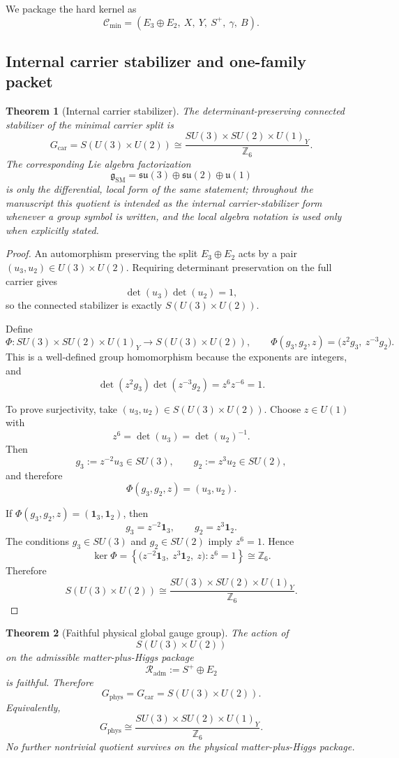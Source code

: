 \documentclass[11pt,a4paper]{article}
\newtheorem{theorem}{Theorem}[section]
\theoremstyle{definition}
\theoremstyle{remark}
\newcommand{\SM}{\mathrm{SM}}
\newcommand{\Cmin}{\mathcal C_{\min}}
\begin{document}
We package the hard kernel as
\[
\Cmin=(E_3\oplus E_2,\ X,\ Y,\ S^+,\ \gamma,\ B).
\]

\subsection{Internal carrier stabilizer and one-family packet}

\begin{theorem}[Internal carrier stabilizer]
\label{thm:global-sm-theorem}
The determinant-preserving connected stabilizer of the minimal carrier split is
\[
G_{\mathrm{car}}
=
S(U(3)\times U(2))
\cong
\frac{SU(3)\times SU(2)\times U(1)_Y}{\mathbb Z_6}.
\]
The corresponding Lie algebra factorization
\[
\mathfrak g_{\SM}=\mathfrak{su}(3)\oplus\mathfrak{su}(2)\oplus\mathfrak u(1)
\]
is only the differential, local form of the same statement; throughout the manuscript this quotient
is intended as the internal carrier-stabilizer form whenever a group symbol is written, and the
local algebra notation is used only when explicitly stated.
\end{theorem}

\begin{proof}
An automorphism preserving the split $E_3\oplus E_2$ acts by a pair
$(u_3,u_2)\in U(3)\times U(2)$. Requiring determinant preservation on the full
carrier gives
\[
\det(u_3)\det(u_2)=1,
\]
so the connected stabilizer is exactly $S(U(3)\times U(2))$.

Define
\[
\Phi:SU(3)\times SU(2)\times U(1)_Y \longrightarrow S(U(3)\times U(2)),
\qquad
\Phi(g_3,g_2,z)=\bigl(z^2 g_3,\ z^{-3} g_2\bigr).
\]
This is a well-defined group homomorphism because the exponents are integers, and
\[
\det(z^2 g_3)\det(z^{-3} g_2)=z^6 z^{-6}=1.
\]

To prove surjectivity, take $(u_3,u_2)\in S(U(3)\times U(2))$. Choose
$z\in U(1)$ with
\[
z^6=\det(u_3)=\det(u_2)^{-1}.
\]
Then
\[
g_3:=z^{-2}u_3\in SU(3),
\qquad
g_2:=z^{3}u_2\in SU(2),
\]
and therefore
\[
\Phi(g_3,g_2,z)=(u_3,u_2).
\]

If $\Phi(g_3,g_2,z)=(\mathbf 1_3,\mathbf 1_2)$, then
\[
g_3=z^{-2}\mathbf 1_3,
\qquad
g_2=z^{3}\mathbf 1_2.
\]
The conditions $g_3\in SU(3)$ and $g_2\in SU(2)$ imply $z^6=1$. Hence
\[
\ker\Phi
=
\left\{
\bigl(z^{-2}\mathbf 1_3,\ z^{3}\mathbf 1_2,\ z\bigr): z^6=1
\right\}
\cong \mathbb Z_6.
\]
Therefore
\[
S(U(3)\times U(2))
\cong
\frac{SU(3)\times SU(2)\times U(1)_Y}{\mathbb Z_6}.
\]
\end{proof}

\begin{theorem}[Faithful physical global gauge group]
\label{thm:physical-gauge-group}
\label{thm:physical-gauge-group-faithful}
The action of
\[
S(U(3)\times U(2))
\]
on the admissible matter-plus-Higgs package
\[
\mathcal R_{\mathrm{adm}}:=S^+\oplus E_2
\]
is faithful. Therefore
\[
G_{\mathrm{phys}}=G_{\mathrm{car}}=S(U(3)\times U(2)).
\]
Equivalently,
\[
G_{\mathrm{phys}}
\cong
\frac{SU(3)\times SU(2)\times U(1)_Y}{\mathbb Z_6}.
\]
No further nontrivial quotient survives on the physical matter-plus-Higgs package.
\end{theorem}
\end{document}
